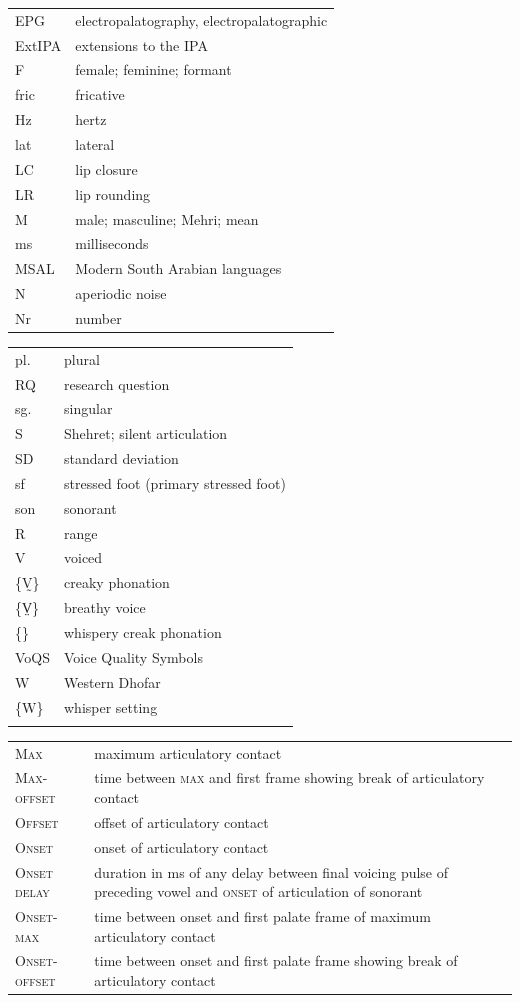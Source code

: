 \documentclass[output=paper]{langscibook}
\begin{document}
\noindent
\begin{tabularx}{.45\textwidth}{lQ@{}}
EPG & electropalatography, electropalatographic\\
ExtIPA & extensions to the IPA\\
F & female; feminine; formant\\
fric & fricative\\
Hz & hertz\\
lat & lateral\\
LC & lip closure\\
LR & lip rounding\\
M & male; masculine; Mehri; mean\\
ms & milliseconds\\
MSAL & Modern South Arabian languages\\
N & aperiodic noise\\
Nr & number\\
\end{tabularx}%
\begin{tabularx}{.5\textwidth}{lQ@{}}
pl. & plural\\
RQ & research question\\
sg. & singular\\
S & Shehret; silent articulation\\
SD & standard deviation\\
sf & stressed foot (primary stressed foot)\\
son & sonorant\\
R & range\\
V & voiced\\
\{V̰\} & creaky phonation\\
\{V̤\} & breathy voice\\
\{\Vdottilde{}\} & whispery creak phonation\\
VoQS & Voice Quality Symbols\\
W & Western Dhofar\\
\{W\} & whisper setting\\
\\
\end{tabularx}\bigskip

\noindent
\begin{tabularx}{\textwidth}{@{}lQ@{}}
\textsc{Max} & maximum articulatory contact\\
\textsc{Max-offset} & time between \textsc{max} and first frame showing break of articulatory contact\\
\textsc{Offset} & offset of articulatory contact\\
\textsc{Onset} & onset of articulatory contact\\
\textsc{Onset delay} & duration in ms of any delay between final voicing pulse of preceding vowel and \textsc{onset} of articulation of sonorant\\
\textsc{Onset-max} & time between onset and first palate frame of maximum articulatory contact\\
\textsc{Onset-offset} & time between onset and first palate frame showing break of articulatory contact\\
\end{tabularx}

\printbibliography[heading=subbibliography,notkeyword=this]
\clearpage
\end{document}
